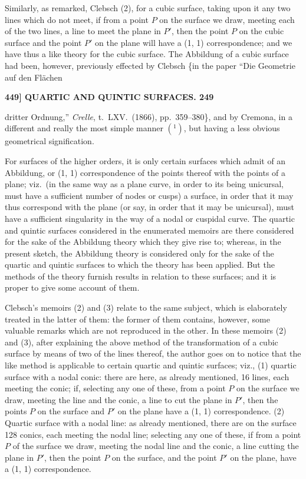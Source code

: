 \documentclass[11pt]{article}
\begin{document}
Similarly, as remarked, Clebsch (2), for a cubic surface, taking upon it any two
lines which do not meet, if from a point $P$ on the surface we draw, meeting each
of the two lines, a line to meet the plane in $P'$, then the point $P$ on the cubic
surface and the point $P'$ on the plane will have a (1, 1) correspondence; and we have
thus a like theory for the cubic surface. The Abbildung of a cubic surface had been,
however, previously effected by Clebsch \{in the paper ``Die Geometrie auf den Fl\"achen

\medskip
\noindent\textbf{449] \quad QUARTIC AND QUINTIC SURFACES. \hfill 249}

\medskip

dritter Ordnung,'' \textit{Crelle}, t.\ LXV.\ (1866), pp.~359--380\}, and by Cremona, in a different
and really the most simple manner $(^1)$, but having a less obvious geometrical signification.

For surfaces of the higher orders, it is only certain surfaces which admit of an
Abbildung, or (1, 1) correspondence of the points thereof with the points of a plane;
viz.\ (in the same way as a plane curve, in order to its being unicursal, must have a
sufficient number of nodes or cusps) a surface, in order that it may thus correspond
with the plane (or say, in order that it may be unicursal), must have a sufficient
singularity in the way of a nodal or cuspidal curve. The quartic and quintic surfaces
considered in the enumerated memoirs are there considered for the sake of the
Abbildung theory which they give rise to; whereas, in the present sketch, the Abbildung
theory is considered only for the sake of the quartic and quintic surfaces to which
the theory has been applied. But the methods of the theory furnish results in relation
to these surfaces; and it is proper to give some account of them.

Clebsch's memoirs (2) and (3) relate to the same subject, which is elaborately
treated in the latter of them: the former of them contains, however, some valuable
remarks which are not reproduced in the other. In these memoirs (2) and (3), after
explaining the above method of the transformation of a cubic surface by means of
two of the lines thereof, the author goes on to notice that the like method is
applicable to certain quartic and quintic surfaces; viz., (1) quartic surface with a nodal
conic: there are here, as already mentioned, 16 lines, each meeting the conic; if,
selecting any one of these, from a point $P$ on the surface we draw, meeting the line
and the conic, a line to cut the plane in $P'$, then the points $P$ on the surface and
$P'$ on the plane have a (1, 1) correspondence. (2) Quartic surface with a nodal line:
as already mentioned, there are on the surface 128 conics, each meeting the nodal
line; selecting any one of these, if from a point $P$ of the surface we draw, meeting
the nodal line and the conic, a line cutting the plane in $P'$, then the point $P$ on
the surface, and the point $P'$ on the plane, have a (1, 1) correspondence.
\end{document}
